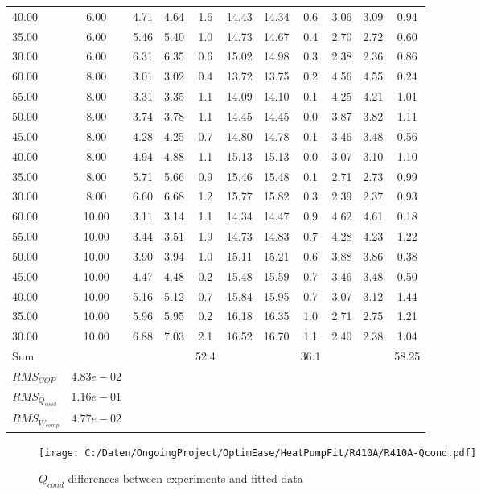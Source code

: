 \documentclass[english]{SPFShortReport}
\begin{document}
\begin{table}[!ht]
\begin{adjustbox}{max width =\textwidth}
\begin{tabular}{l | c c c c c c c c c c }
40.00  & 6.00 & 4.71 & 4.64 & 1.6 & 14.43 & 14.34 & 0.6 & 3.06 & 3.09 & 0.94\\ 
35.00  & 6.00 & 5.46 & 5.40 & 1.0 & 14.73 & 14.67 & 0.4 & 2.70 & 2.72 & 0.60\\ 
30.00  & 6.00 & 6.31 & 6.35 & 0.6 & 15.02 & 14.98 & 0.3 & 2.38 & 2.36 & 0.86\\ 
60.00  & 8.00 & 3.01 & 3.02 & 0.4 & 13.72 & 13.75 & 0.2 & 4.56 & 4.55 & 0.24\\ 
55.00  & 8.00 & 3.31 & 3.35 & 1.1 & 14.09 & 14.10 & 0.1 & 4.25 & 4.21 & 1.01\\ 
50.00  & 8.00 & 3.74 & 3.78 & 1.1 & 14.45 & 14.45 & 0.0 & 3.87 & 3.82 & 1.11\\ 
45.00  & 8.00 & 4.28 & 4.25 & 0.7 & 14.80 & 14.78 & 0.1 & 3.46 & 3.48 & 0.56\\ 
40.00  & 8.00 & 4.94 & 4.88 & 1.1 & 15.13 & 15.13 & 0.0 & 3.07 & 3.10 & 1.10\\ 
35.00  & 8.00 & 5.71 & 5.66 & 0.9 & 15.46 & 15.48 & 0.1 & 2.71 & 2.73 & 0.99\\ 
30.00  & 8.00 & 6.60 & 6.68 & 1.2 & 15.77 & 15.82 & 0.3 & 2.39 & 2.37 & 0.93\\ 
60.00  & 10.00 & 3.11 & 3.14 & 1.1 & 14.34 & 14.47 & 0.9 & 4.62 & 4.61 & 0.18\\ 
55.00  & 10.00 & 3.44 & 3.51 & 1.9 & 14.73 & 14.83 & 0.7 & 4.28 & 4.23 & 1.22\\ 
50.00  & 10.00 & 3.90 & 3.94 & 1.0 & 15.11 & 15.21 & 0.6 & 3.88 & 3.86 & 0.38\\ 
45.00  & 10.00 & 4.47 & 4.48 & 0.2 & 15.48 & 15.59 & 0.7 & 3.46 & 3.48 & 0.50\\ 
40.00  & 10.00 & 5.16 & 5.12 & 0.7 & 15.84 & 15.95 & 0.7 & 3.07 & 3.12 & 1.44\\ 
35.00  & 10.00 & 5.96 & 5.95 & 0.2 & 16.18 & 16.35 & 1.0 & 2.71 & 2.75 & 1.21\\ 
30.00  & 10.00 & 6.88 & 7.03 & 2.1 & 16.52 & 16.70 & 1.1 & 2.40 & 2.38 & 1.04\\ 
\hline 
 Sum &  & &  & 52.4 &  &  & 36.1 & &  & 58.25\\ 
\hline 
 $RMS_{COP}$ & $4.83e-02$ \\ 
 $RMS_{Q_{cond}}$ & $1.16e-01$ \\ 
 $RMS_{W_{comp}}$ & $4.77e-02$ \\ 
\hline
\hline
\end{tabular}
\end{adjustbox}
\label{ErrorsTable}
\end{table}
\begin{figure}[!htbp]
\begin{center}
\texttt{[image: C:/Daten/OngoingProject/OptimEase/HeatPumpFit/R410A/R410A-Qcond.pdf]}
\caption{$Q_{cond}$ differences between experiments and fitted data}
\label{QcongFig}
\end{center}
\end{figure}
\end{document}
